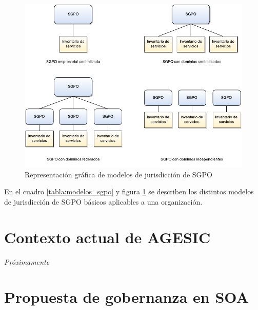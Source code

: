 \documentclass[11pt]{article}
\begin{document}
		\begin{figure}[h]
			\centering
			\includegraphics[width=\linewidth]{modelos_sgpo}
			\caption{Representación gráfica de modelos de jurisdicción de SGPO}
			\label{imagen:modelos_sgpo}
		\end{figure}

		En el cuadro \ref{tabla:modelos_sgpo} y figura \ref{imagen:modelos_sgpo} se describen los distintos modelos de jurisdicción de SGPO básicos aplicables a una organización.

	\section{Contexto actual de AGESIC}
		\emph{Próximamente} %

	\section{Propuesta de gobernanza en SOA}
\end{document}
